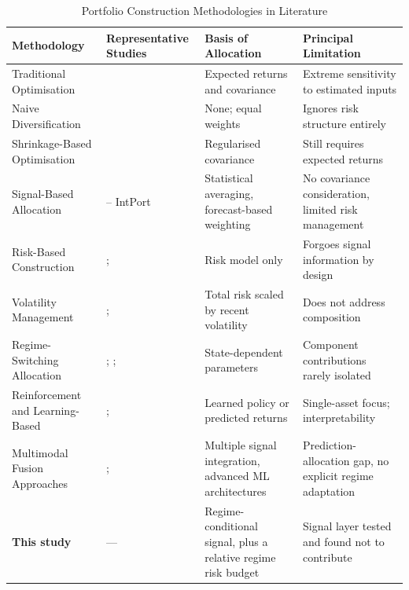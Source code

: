\begin{table}[!ht]
\centering
\caption{Portfolio Construction Methodologies in Literature}
\label{tab:paradigms}
\footnotesize
\begin{tabular}{p{2.3cm}p{2.5cm}p{2.6cm}p{2.6cm}}
\hline
\textbf{Methodology} & \textbf{Representative Studies} & \textbf{Basis of Allocation} & \textbf{Principal Limitation} \\
\hline
Traditional Optimisation & \citet{markowitz52} & Expected returns and covariance & Extreme sensitivity to estimated inputs \\
\hline
Naive Diversification & \citet{demiguel09} & None; equal weights & Ignores risk structure entirely \\
\hline
Shrinkage-Based Optimisation & \citet{ledoit04} & Regularised covariance & Still requires expected returns \\
\hline
Signal-Based Allocation & \citet{sami25} -- IntPort & Statistical averaging, forecast-based weighting & No covariance consideration, limited risk management \\
\hline
Risk-Based Construction & \citet{prado16}; \citet{asimit25} & Risk model only & Forgoes signal information by design \\
\hline
Volatility Management & \citet{moreira17}; \citet{hood25} & Total risk scaled by recent volatility & Does not address composition \\
\hline
Regime-Switching Allocation & \citet{kritzman12}; \citet{li25}; \citet{luo26} & State-dependent parameters & Component contributions rarely isolated \\
\hline
Reinforcement and Learning-Based & \citet{kabbani22}; \citet{ha26} & Learned policy or predicted returns & Single-asset focus; interpretability \\
\hline
Multimodal Fusion Approaches & \citet{moodi24}; \citet{farimani24} & Multiple signal integration, advanced ML architectures & Prediction-allocation gap, no explicit regime adaptation \\
\hline
\textbf{This study} & --- & Regime-conditional signal, plus a relative regime risk budget & Signal layer tested and found not to contribute \\
\hline
\end{tabular}
\end{table}
